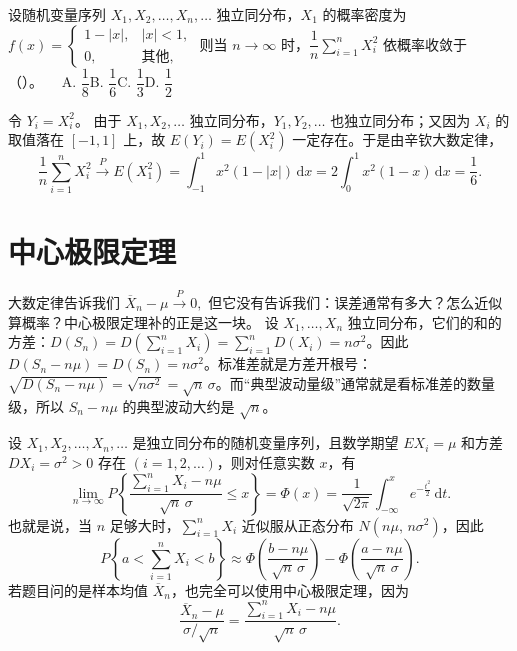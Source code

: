 \documentclass[lang=cn,11pt]{elegantbook}
\begin{document}
\begin{exercise}\label{exer:5-khinchin-x2}
设随机变量序列 \(X_1, X_2, \dots, X_n, \dots\) 独立同分布，\(X_1\) 的概率密度为
\(
f(x) = \begin{cases} 1 - |x|, & |x| < 1, \\ 0, & \text{其他}, \end{cases}
\)
则当 \(n \to \infty\) 时，\(\dfrac{1}{n}\displaystyle\sum_{i=1}^{n} X_i^2\) 依概率收敛于（\quad）。~~
A. \(\dfrac{1}{8}\)\quad B. \(\dfrac{1}{6}\)\quad C. \(\dfrac{1}{3}\)\quad D. \(\dfrac{1}{2}\)
\end{exercise}
\begin{solution}
令 \(Y_i=X_i^2\)。
由于 \(X_1,X_2,\dots\) 独立同分布，\(Y_1,Y_2,\dots\) 也独立同分布；又因为 \(X_i\) 的取值落在 \([-1,1]\) 上，故 \(E(Y_i)=E(X_i^2)\) 一定存在。于是由辛钦大数定律，
\[
\frac{1}{n}\sum_{i=1}^{n} X_i^2 \stackrel{P}{\longrightarrow} E(X_1^2) = \int_{-1}^{1} x^2(1-|x|)\,\mathrm{d}x = 2\int_0^1 x^2(1-x)\,\mathrm{d}x=\frac{1}{6}.
\]
\end{solution}

\section{中心极限定理}

大数定律告诉我们
\(
\overline{X}_n-\mu \stackrel{P}{\longrightarrow} 0,
\)
但它没有告诉我们：误差通常有多大？怎么近似算概率？中心极限定理补的正是这一块。
设 \(X_1,\dots,X_n\) 独立同分布，它们的和的方差：\(D(S_n)=D\left(\sum_{i=1}^n X_i\right)=\sum_{i=1}^nD(X_i)=n\sigma^2\)。因此 \(D(S_n-n\mu)=D(S_n)=n\sigma^2\)。标准差就是方差开根号：\(\sqrt{D(S_n-n\mu)}=\sqrt{n\sigma^2}=\sqrt n\,\sigma\)。而“典型波动量级”通常就是看标准差的数量级，所以 \(S_n-n\mu\) 的典型波动大约是 \(\sqrt n\)。


\begin{theorem} \label{thm:levy-lindberg}
设 \(X_1, X_2, \dots, X_n, \dots\) 是独立同分布的随机变量序列，且数学期望 \(EX_i = \mu\) 和方差 \(DX_i = \sigma^2 > 0\) 存在 \((i = 1, 2, \dots)\)，则对任意实数 \(x\)，有
\[
\lim_{n\to\infty} P\!\left\{\frac{\sum_{i=1}^{n} X_i - n\mu}{\sqrt{n}\,\sigma} \leq x\right\} = \Phi(x)=\frac{1}{\sqrt{2\pi}}\int_{-\infty}^x e^{-\frac{t^2}{2}}\,\mathrm{d}t.
\]也就是说，当 \(n\) 足够大时，\(\displaystyle\sum_{i=1}^{n} X_i\) 近似服从正态分布 \(N(n\mu,\, n\sigma^2)\)，因此
\[
P\!\left\{a < \sum_{i=1}^{n} X_i < b\right\} \approx \Phi\!\left(\frac{b - n\mu}{\sqrt{n}\,\sigma}\right) - \Phi\!\left(\frac{a - n\mu}{\sqrt{n}\,\sigma}\right).
\]若题目问的是样本均值 \(\overline{X}_n\)，也完全可以使用中心极限定理，因为
\[
\frac{\overline{X}_n-\mu}{\sigma/\sqrt{n}}
=\frac{\sum_{i=1}^n X_i-n\mu}{\sqrt{n}\,\sigma}.
\]
\end{theorem}
\end{document}

